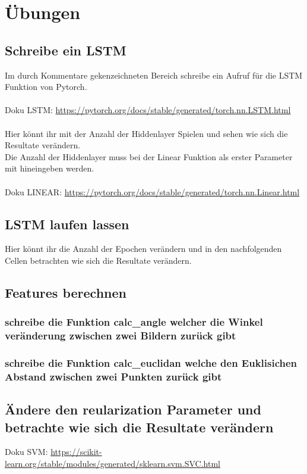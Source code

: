 \documentclass{article}
\begin{document}
\newpage
\section{Übungen}

\subsection{Schreibe ein LSTM}

Im durch Kommentare gekenzeichneten Bereich schreibe ein Aufruf für die LSTM Funktion von Pytorch. \\ \\
Doku LSTM:  \href{https://pytorch.org/docs/stable/generated/torch.nn.LSTM.html}{https://pytorch.org/docs/stable/generated/torch.nn.LSTM.html}\\ \\
Hier könnt ihr mit der Anzahl der Hiddenlayer Spielen und sehen wie sich die Resultate verändern.\\
Die Anzahl der Hiddenlayer muss bei der Linear Funktion als erster Parameter mit hineingeben werden.\\ \\
Doku LINEAR: \href{https://pytorch.org/docs/stable/generated/torch.nn.Linear.html}{https://pytorch.org/docs/stable/generated/torch.nn.Linear.html}

\subsection{LSTM laufen lassen}
Hier könnt ihr die Anzahl der Epochen verändern und in den nachfolgenden Cellen betrachten wie sich die Resultate verändern.

\subsection{Features berechnen} 
\subsubsection{schreibe die Funktion calc\_angle welcher die Winkel veränderung zwischen zwei Bildern zurück gibt} 
\subsubsection{schreibe die Funktion calc\_euclidan welche den Euklisichen Abstand zwischen zwei Punkten zurück gibt} 

\subsection{Ändere den reularization Parameter und betrachte wie sich die Resultate verändern}

Doku SVM: \href{https://scikit-learn.org/stable/modules/generated/sklearn.svm.SVC.html}{https://scikit-learn.org/stable/modules/generated/sklearn.svm.SVC.html}
\end{document}
